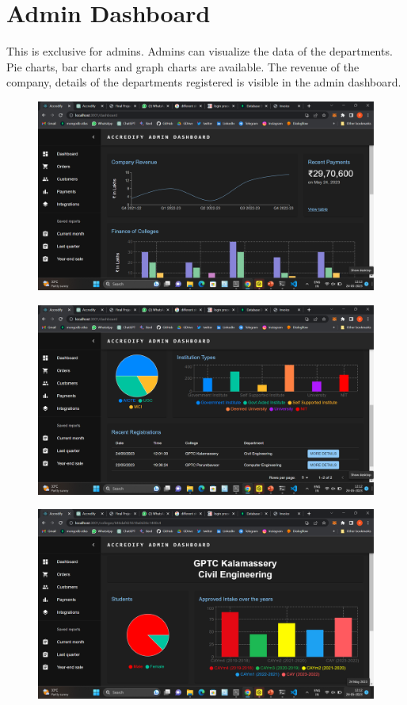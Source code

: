 \documentclass[a4paper,11pt]{report}
\begin{document}
\section{Admin Dashboard}
This is exclusive for admins. Admins can visualize the data of the departments. Pie charts, bar charts and graph charts are available. The revenue of the company, details of the departments registered is visible in the admin dashboard. 
\begin{figure}[h]
	\centering
	\hspace{21pt}
	\includegraphics[width=.70\linewidth]{accredify11.png}
	\label{fig:logo.png}
\end{figure}
\begin{figure}[h]
	\centering
	\hspace{21pt}
	\includegraphics[width=.70\linewidth]{accredify12.png}
	\label{fig:logo.png}
\end{figure}
\begin{figure}[h]
	\centering
	\hspace{21pt}
	\includegraphics[width=.70\linewidth]{accredify13.png}
	\label{fig:logo.png}
\end{figure}
\end{document}

